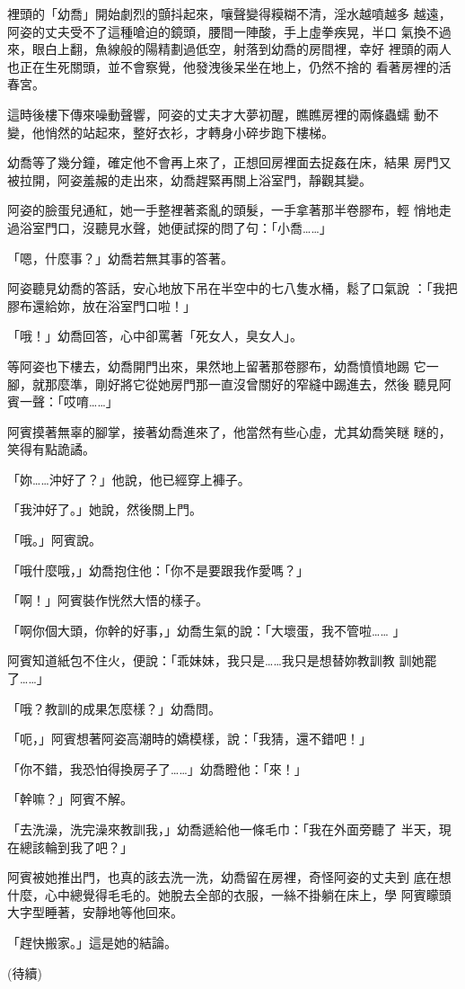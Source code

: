 裡頭的「幼喬」開始劇烈的顫抖起來，嚷聲變得糢糊不清，淫水越噴越多
越遠，阿姿的丈夫受不了這種嗆迫的鏡頭，腰間一陣酸，手上虛拳疾晃，半口
氣換不過來，眼白上翻，魚線般的陽精劃過低空，射落到幼喬的房間裡，幸好
裡頭的兩人也正在生死關頭，並不會察覺，他發洩後呆坐在地上，仍然不捨的
看著房裡的活春宮。

這時後樓下傳來噪動聲響，阿姿的丈夫才大夢初醒，瞧瞧房裡的兩條蟲蠕
動不變，他悄然的站起來，整好衣衫，才轉身小碎步跑下樓梯。

幼喬等了幾分鐘，確定他不會再上來了，正想回房裡面去捉姦在床，結果
房門又被拉開，阿姿羞赧的走出來，幼喬趕緊再關上浴室門，靜觀其變。

阿姿的臉蛋兒通紅，她一手整裡著紊亂的頭髮，一手拿著那半卷膠布，輕
悄地走過浴室門口，沒聽見水聲，她便試探的問了句：「小喬……」

「嗯，什麼事？」幼喬若無其事的答著。

阿姿聽見幼喬的答話，安心地放下吊在半空中的七八隻水桶，鬆了口氣說
：「我把膠布還給妳，放在浴室門口啦！」

「哦！」幼喬回答，心中卻罵著「死女人，臭女人」。

等阿姿也下樓去，幼喬開門出來，果然地上留著那卷膠布，幼喬憤憤地踢
它一腳，就那麼準，剛好將它從她房門那一直沒曾關好的窄縫中踢進去，然後
聽見阿賓一聲：「哎唷……」

阿賓摸著無辜的腳掌，接著幼喬進來了，他當然有些心虛，尤其幼喬笑瞇
瞇的，笑得有點詭譎。

「妳……沖好了？」他說，他已經穿上褲子。

「我沖好了。」她說，然後關上門。

「哦。」阿賓說。

「哦什麼哦，」幼喬抱住他：「你不是要跟我作愛嗎？」

「啊！」阿賓裝作恍然大悟的樣子。

「啊你個大頭，你幹的好事，」幼喬生氣的說：「大壞蛋，我不管啦……
」

阿賓知道紙包不住火，便說：「乖妹妹，我只是……我只是想替妳教訓教
訓她罷了……」

「哦？教訓的成果怎麼樣？」幼喬問。

「呃，」阿賓想著阿姿高潮時的嬌模樣，說：「我猜，還不錯吧！」

「你不錯，我恐怕得換房子了……」幼喬瞪他：「來！」

「幹嘛？」阿賓不解。

「去洗澡，洗完澡來教訓我，」幼喬遞給他一條毛巾：「我在外面旁聽了
半天，現在總該輪到我了吧？」

阿賓被她推出門，也真的該去洗一洗，幼喬留在房裡，奇怪阿姿的丈夫到
底在想什麼，心中總覺得毛毛的。她脫去全部的衣服，一絲不掛躺在床上，學
阿賓矇頭大字型睡著，安靜地等他回來。

「趕快搬家。」這是她的結論。

(待續)










